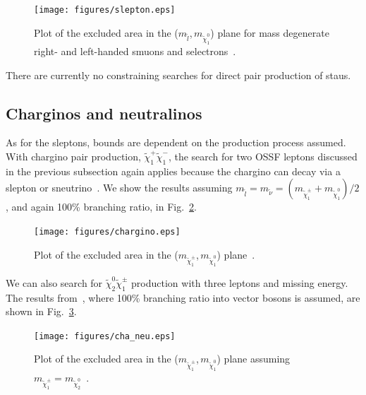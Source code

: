 \documentclass[notes.tex]{subfiles}
\begin{document}
\begin{figure}[h!]
\begin{center}
\texttt{[image: figures/slepton.eps]} 
\caption{Plot of the excluded area in the ($m_{\tilde l}$,\,$m_{\tilde{\chi}^0_1}$) plane for mass degenerate right- and left-handed smuons and selectrons~\cite{ATLAS-CONF-2013-049}.\label{fig:slepton}}
\end{center}
\end{figure}

There are currently no constraining searches for direct pair production of staus.

\subsection{Charginos and neutralinos}
As for the sleptons, bounds are dependent on the production process assumed. With chargino pair production, $\tilde\chi_1^+\tilde\chi_1^-$, the search for two OSSF leptons discussed in the previous subsection again applies because the chargino can decay via a slepton or sneutrino~\cite{ATLAS-CONF-2013-049}. We show the results assuming $m_{\tilde l}=m_{\tilde\nu} = (m_{\tilde\chi_1^\pm} +m_{\tilde\chi_1^0})/2$, and again 100\% branching ratio, in Fig.~\ref{fig:chargino}.

\begin{figure}[h!]
\begin{center}
\texttt{[image: figures/chargino.eps]} 
\caption{Plot of the excluded area in the ($m_{\tilde\chi_1^\pm}$,\,$m_{\tilde{\chi}^0_1}$) plane~\cite{ATLAS-CONF-2013-049}.\label{fig:chargino}}
\end{center}
\end{figure}

We can also search for $\tilde\chi_2^0\tilde\chi_1^\pm$ production with three leptons and missing energy. 
The results from~\cite{ATLAS-CONF-2013-035}, where 100\% branching ratio into vector bosons is assumed, are shown in Fig.~\ref{fig:cha_neu}.

\begin{figure}[h!]
\begin{center}
\texttt{[image: figures/cha\_neu.eps]} 
\caption{Plot of the excluded area in the ($m_{\tilde\chi_1^\pm}$,\,$m_{\tilde{\chi}^0_1}$) plane assuming $m_{\tilde\chi_1^\pm}=m_{\tilde\chi_2^0}$~\cite{ATLAS-CONF-2013-035}.\label{fig:cha_neu}}
\end{center}
\end{figure}
\end{document}
